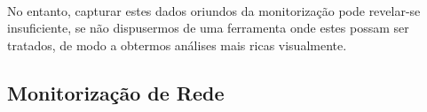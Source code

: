 \paragraph*{
}
No entanto, capturar estes dados oriundos da monitorização pode revelar-se insuficiente, se não dispusermos de uma ferramenta onde estes possam ser tratados, de modo a obtermos análises mais ricas visualmente.

\subsection{Monitorização de Rede}\label{sect:packet_capture}

% 
% 
% 
% 
% 
